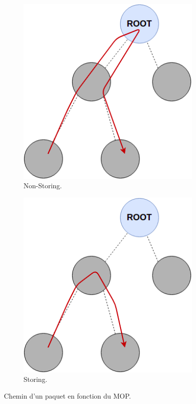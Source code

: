     \begin{figure}[H]
        \centering
        \begin{subfigure}[b]{0.45\textwidth}
            \includegraphics[scale=0.4]{res/pictures/rpl-nonstoring.drawio.png}
            \caption{Non-Storing.}
            \label{fig:state-path-nonstoring}
        \end{subfigure}
        \hfill
        \begin{subfigure}[b]{0.45\textwidth}
            \includegraphics[scale=0.4]{res/pictures/rpl-storing.drawio.png}
            \caption{Storing.}
            \label{fig:state-path-storing}
        \end{subfigure}
        \caption{Chemin d'un paquet en fonction du MOP.}
        \label{fig:state-path-mop}
    \end{figure}

